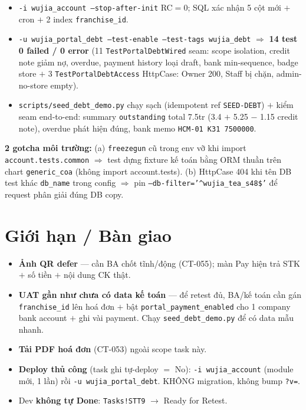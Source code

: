 \begin{itemize}
  \item \texttt{-i wujia\_account --stop-after-init} RC$=$0; SQL xác nhận 5 cột mới $+$ cron $+$
    2 index \texttt{franchise\_id}.
  \item \texttt{-u wujia\_portal\_debt --test-enable --test-tags wujia\_debt} $\Rightarrow$
    \textbf{14 test 0 failed / 0 error} (11 \texttt{TestPortalDebtWired} seam: scope isolation,
    credit note giảm nợ, overdue, payment history loại draft, bank min-sequence, badge store $+$
    3 \texttt{TestPortalDebtAccess} HttpCase: Owner 200, Staff bị chặn, admin-no-store empty).
  \item \texttt{scripts/seed\_debt\_demo.py} chạy sạch (idempotent ref \texttt{SEED-DEBT}) $+$
    kiểm seam end-to-end: summary \texttt{outstanding} total 7.5tr (3.4 $+$ 5.25 $-$ 1.15 credit
    note), overdue phát hiện đúng, bank memo \texttt{HCM-01 K31 7500000}.
\end{itemize}

\textbf{2 gotcha môi trường:} (a) \texttt{freezegun} cũ trong env vỡ khi import
\texttt{account.tests.common} $\Rightarrow$ test dựng fixture kế toán bằng ORM thuần trên chart
\texttt{generic\_coa} (không import account.tests). (b) HttpCase 404 khi tên DB test khác
\texttt{db\_name} trong config $\Rightarrow$ pin \texttt{--db-filter='\^{}wujia\_tea\_s48\$'} để
request phân giải đúng DB copy.

\section{Giới hạn / Bàn giao}

\begin{itemize}
  \item \textbf{Ảnh QR defer} --- cần BA chốt tĩnh/động (CT-055); màn Pay hiện trả STK $+$ số
    tiền $+$ nội dung CK thật.
  \item \textbf{UAT gần như chưa có data kế toán} --- để retest đủ, BA/kế toán cần gán
    \texttt{franchise\_id} lên hoá đơn $+$ bật \texttt{portal\_payment\_enabled} cho 1 company
    bank account $+$ ghi vài payment. Chạy \texttt{seed\_debt\_demo.py} để có data mẫu nhanh.
  \item \textbf{Tải PDF hoá đơn} (CT-053) ngoài scope task này.
  \item \textbf{Deploy thủ công} (task ghi tự-deploy $=$ No): \texttt{-i wujia\_account} (module
    mới, 1 lần) rồi \texttt{-u wujia\_portal\_debt}. KHÔNG migration, không bump \texttt{?v=}.
  \item Dev \textbf{không tự Done}: \texttt{Tasks!STT9} $\to$ Ready for Retest.
\end{itemize}
